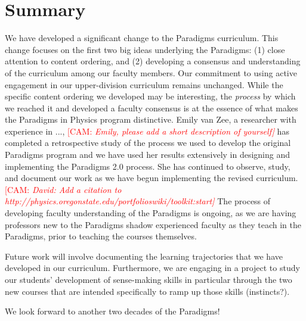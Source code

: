 \documentclass[english,aps,pra,reprint,noshowpacs,superscriptaddress]{revtex4-1}
\newcommand\corinnesays[1]{\textcolor{red}{[\sc CAM: \em{#1}]}}
\begin{document}
\section{Summary}
We have developed a significant change to the Paradigms
curriculum.  This change focuses on the first two big ideas underlying
the Paradigms: (1) close attention to content ordering, and (2)
developing a consensus and understanding of the curriculum among our
faculty members.  Our commitment to using active engagement in our
upper-division curriculum remains unchanged.  While the specific
content ordering we developed may be interesting, the \emph{process} by
which we reached it and developed a faculty consensus is at the
essence of what makes the Paradigms in Physics program distinctive.
Emily van Zee, a researcher with experience in ..., 
\corinnesays{Emily, please add a short description of yourself} 
has completed a retrospective study of the process we used to develop the 
original Paradigms program and we have used her results extensively in 
designing and implementing the Paradigms 2.0 process.  She has continued 
to observe, study, and document our work as we have begun implementing 
the revised curriculum. 
\corinnesays{David:  Add a citation to http://physics.oregonstate.edu/portfolioswiki/toolkit:start}
The process of developing faculty understanding of the Paradigms is
ongoing, as we are having professors new to the Paradigms shadow
experienced faculty as they teach in the Paradigms, prior to teaching
the courses themselves.  

Future work will involve documenting the learning trajectories that we
have developed in our curriculum.  Furthermore, we are engaging in a
project to study our students' development of sense-making skills in
particular through the two new courses that are intended specifically
to ramp up those skills (instincts?).

We look forward to another two decades of the Paradigms!




\end{document}
